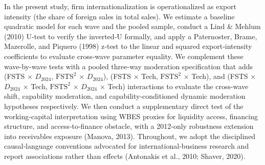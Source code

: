 \documentclass[12pt,a4paper]{article}
\begin{document}
In the present study, firm internationalization is operationalized as
export intensity (the share of foreign sales in total sales). We
estimate a baseline quadratic model for each wave and the pooled sample,
conduct a Lind \& Mehlum (2010) U‑test to verify the inverted‑U
formally, and apply a Paternoster, Brame, Mazerolle, and Piquero (1998)
z‑test to the linear and squared export‑intensity coefficients to
evaluate cross‑wave parameter equality. We complement these wave-by-wave
tests with a pooled three-way moderation specification that adds (FSTS ×
\(D_{2024}\), \(\mathrm{FSTS}^2\) × \(D_{2024}\)), (FSTS × Tech,
\(\mathrm{FSTS}^2\) × Tech), and (FSTS × \(D_{2024}\) × Tech,
\(\mathrm{FSTS}^2\) × \(D_{2024}\) × Tech) interactions to evaluate the
cross-wave shift, capability moderation, and capability-conditioned
dynamic moderation hypotheses respectively. We then conduct a
supplementary direct test of the working‑capital interpretation using
WBES proxies for liquidity access, financing structure, and
access‑to‑finance obstacle, with a 2012‑only robustness extension into
receivables exposure (Manova, 2013). Throughout, we adopt the
disciplined causal‑language conventions advocated for
international‑business research and report associations rather than
effects (Antonakis et al., 2010; Shaver, 2020).
\end{document}
